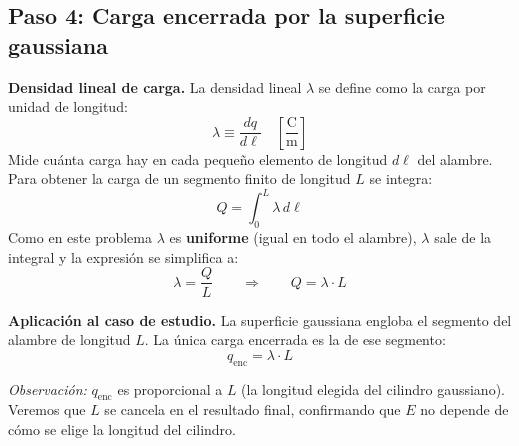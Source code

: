\documentclass[12pt,letterpaper]{article}
\begin{document}
\bigskip

\subsection*{Paso 4: Carga encerrada por la superficie gaussiana}

\noindent
\begin{minipage}[c]{0.32\textwidth}
\centering
{}
\end{minipage}%
\hfill
\begin{minipage}[c]{0.65\textwidth}
\textbf{Densidad lineal de carga.}
La densidad lineal $\lambda$ se define como la carga por unidad de longitud:
\[
    \lambda \equiv \frac{dq}{d\ell}
    \quad \left[\frac{\text{C}}{\text{m}}\right]
\]
Mide cu\'anta carga hay en cada peque\~no elemento de longitud $d\ell$ del alambre.
Para obtener la carga de un segmento finito de longitud $L$ se integra:
\[
    Q = \int_0^L \lambda\, d\ell
\]
Como en este problema $\lambda$ es \textbf{uniforme} (igual en todo el alambre),
$\lambda$ sale de la integral y la expresi\'on se simplifica a:
\[
    \lambda = \frac{Q}{L}
    \qquad\Longrightarrow\qquad
    Q = \lambda \cdot L
\]

\medskip
\textbf{Aplicaci\'on al caso de estudio.}
La superficie gaussiana engloba el segmento del alambre de longitud $L$.
La \'unica carga encerrada es la de ese segmento:
\[
    q_\text{enc} = \lambda \cdot L
\]

\textit{Observaci\'on:} $q_\text{enc}$ es proporcional a $L$ (la longitud elegida
del cilindro gaussiano). Veremos que $L$ se cancela en el resultado final,
confirmando que $E$ no depende de c\'omo se elige la longitud del cilindro.
\end{minipage}
\end{document}
